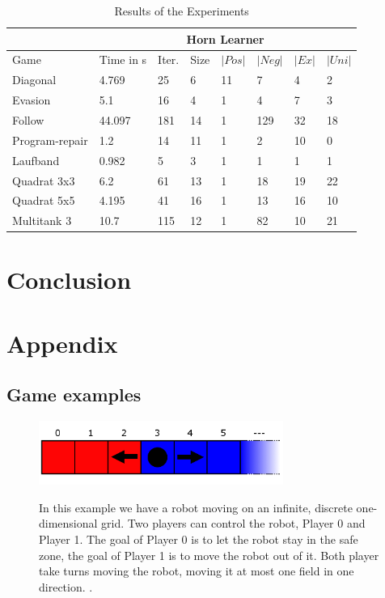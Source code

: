 \documentclass[10pt,a4paper]{article}
\theoremstyle{plain}
\theoremstyle{definition}
\begin{document}
\begin{table}[h]
 \caption{Results of the Experiments}
\begin{tabularx}{\textwidth}{p{}p{} p{} p{}p{} p{} p{} p{}}
\hline
& \multicolumn{7}{c}{Horn Learner}\\ \hline
Game & Time in s & Iter.& Size & $|Pos|$ & $|Neg|$ & $|Ex|$ & $|Uni|$ \\ \hline
Diagonal & 4.769 & 25 & 6 & 11 & 7 & 4 & 2 \\ 
Evasion & 5.1 & 16 & 4 & 1 & 4 & 7 & 3 \\ 
Follow & 44.097 & 181 & 14 & 1 & 129 & 32 & 18 \\ 
Program-repair & 1.2 & 14 & 11 & 1 & 2 & 10 & 0 \\
Laufband & 0.982 & 5 & 3 & 1 & 1 & 1 & 1 \\ 
Quadrat 3x3 & 6.2 & 61 & 13 & 1 & 18 & 19 & 22 \\
Quadrat 5x5 & 4.195 & 41 & 16 & 1 & 13 & 16 & 10 \\
Multitank 3 & 10.7 & 115& 12 & 1 & 82 & 10 & 21 \\

\end{tabularx}
 \label{tab:TESTS} 
\end{table}
\newpage
\section{Conclusion}
\newpage
\section{Appendix}
\subsection{Game examples}
\begin{figure}[h] \label{Laufband}
  \caption{In this example we have a robot moving on an infinite, discrete one-dimensional grid. Two players can control the robot, Player 0 and Player 1. The goal of Player 0 is to let the robot stay in the safe zone, the goal of Player 1 is to move the robot out of it. Both player take turns moving the robot, moving it at most one field in one direction.
.}
  \centering
    {\includegraphics[width=8.0cm]{laufband.png}} 

\end{figure}
\end{document}
